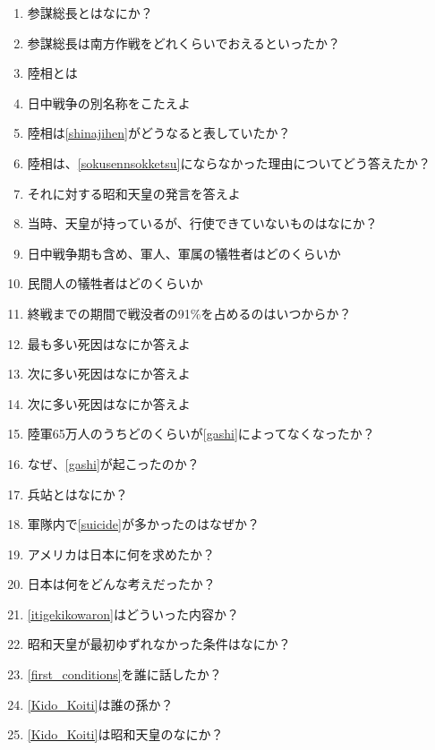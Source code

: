 \documentclass[]{jsarticle}
\begin{document}
\begin{enumerate}
	\item 参謀総長とはなにか？
	\item 参謀総長は南方作戦をどれくらいでおえるといったか？
	\item 陸相とは
	\item 日中戦争の別名称をこたえよ\label{shinajihen}
	\item 陸相は\ref{shinajihen}がどうなると表していたか？\label{sokusennsokketsu}
	\item 陸相は、\ref{sokusennsokketsu}にならなかった理由についてどう答えたか？
	\item それに対する昭和天皇の発言を答えよ
	\item 当時、天皇が持っているが、行使できていないものはなにか？
	\item 日中戦争期も含め、軍人、軍属の犠牲者はどのくらいか
	\item 民間人の犠牲者はどのくらいか
	\item 終戦までの期間で戦没者の91\%を占めるのはいつからか？
	\item 最も多い死因はなにか答えよ\label{gashi}
	\item 次に多い死因はなにか答えよ\label{disease}
	\item 次に多い死因はなにか答えよ\label{suicide}
	\item 陸軍65万人のうちどのくらいが\ref{gashi}によってなくなったか？
	\item なぜ、\ref{gashi}が起こったのか？
	\item 兵站とはなにか？
	\item 軍隊内で\ref{suicide}が多かったのはなぜか？
		\\
	\item アメリカは日本に何を求めたか？
	\item 日本は何をどんな考えだったか？\label{itigekikowaron}
	\item \ref{itigekikowaron}はどういった内容か？
		\\
	\item 昭和天皇が最初ゆずれなかった条件はなにか？\label{first_conditions}
	\item \ref{first_conditions}を誰に話したか？\label{Kido_Koiti}
	\item \ref{Kido_Koiti}は誰の孫か？
	\item \ref{Kido_Koiti}は昭和天皇のなにか？
\end{enumerate}
\end{document}
